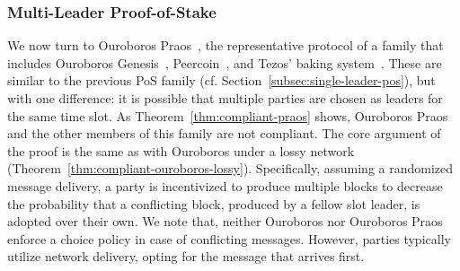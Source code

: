 \subsubsection{Multi-Leader Proof-of-Stake}\label{subsec:multi-leader-pos}

We now turn to Ouroboros Praos~\cite{EC:DGKR18}, the representative protocol of
a family that includes Ouroboros Genesis~\cite{CCS:BGKRZ18},
Peercoin~\cite{king2012ppcoin}, and Tezos' baking system~\cite{tezos-pos}. These
are similar to the previous PoS family (cf.
Section~\ref{subsec:single-leader-pos}), but with one difference: it is
possible that multiple parties are chosen as leaders for the same time slot.
As Theorem~\ref{thm:compliant-praos} shows, Ouroboros Praos and the other
members of this family are not compliant. The core argument of the proof is the
same as with Ouroboros under a lossy network
(Theorem~\ref{thm:compliant-ouroboros-lossy}). Specifically, assuming
a randomized message delivery, a party is incentivized to produce multiple
blocks to decrease the probability that a conflicting block, produced by a
fellow slot leader, is adopted over their own.
We note that, neither Ouroboros nor Ouroboros Praos enforce a choice policy in
case of conflicting messages. However, parties typically utilize network
delivery, opting for the message that arrives first.

